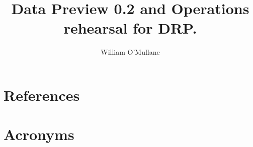 \documentclass[OPS,authoryear,toc]{lsstdoc}
\title{Data Preview 0.2 and Operations rehearsal for DRP.}
\author{%
William O'Mullane
}
\date{\vcsDate}
\begin{document}
\maketitle


\appendix
\section{References} \label{sec:bib}
\renewcommand{\refname}{} %


\section{Acronyms} \label{sec:acronyms}

\end{document}
